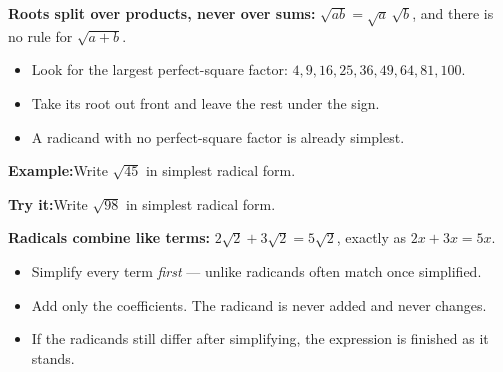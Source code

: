 \documentclass[12pt]{article}
\begin{document}


\begin{formulabox}
\textbf{Roots split over products, never over sums:} $\sqrt{ab} = \sqrt{a}\,\sqrt{b}$, and there is no rule for $\sqrt{a+b}$.
\begin{itemize}[leftmargin=0.8cm, itemsep=0pt, topsep=1pt]
  \item Look for the largest perfect-square factor: $4, 9, 16, 25, 36, 49, 64, 81, 100$.
  \item Take its root out front and leave the rest under the sign.
  \item A radicand with no perfect-square factor is already simplest.
\end{itemize}
\end{formulabox}

\begin{examplebox}
\textbf{Example:}\quad Write $\sqrt{45}$ in simplest radical form.
\end{examplebox}

\begin{tryitbox}
\textbf{Try it:}\quad Write $\sqrt{98}$ in simplest radical form.\\[2pt]
\end{tryitbox}


\begin{formulabox}
\textbf{Radicals combine like terms:} $2\sqrt{2} + 3\sqrt{2} = 5\sqrt{2}$, exactly as $2x + 3x = 5x$.
\begin{itemize}[leftmargin=0.8cm, itemsep=0pt, topsep=1pt]
  \item Simplify every term \emph{first} --- unlike radicands often match once simplified.
  \item Add only the coefficients. The radicand is never added and never changes.
  \item If the radicands still differ after simplifying, the expression is finished as it stands.
\end{itemize}
\end{formulabox}
\end{document}
